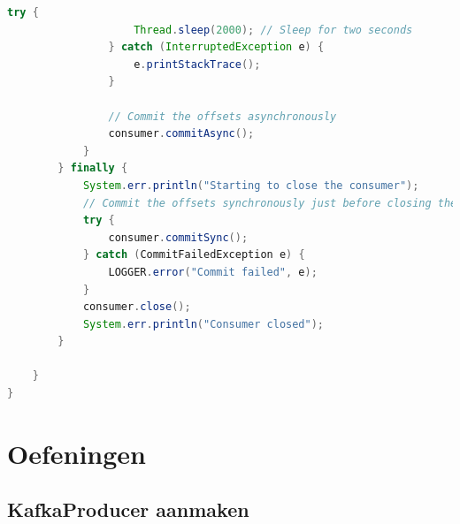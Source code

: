 \documentclass[a4paper,10pt,twoside]{report}
\begin{document}
\begin{lstlisting}[language=Java]
				try {
					Thread.sleep(2000); // Sleep for two seconds 
				} catch (InterruptedException e) {
					e.printStackTrace();
				}
				
				// Commit the offsets asynchronously				
				consumer.commitAsync();				
			}
		} finally {
			System.err.println("Starting to close the consumer");
			// Commit the offsets synchronously just before closing the consumer
			try {
				consumer.commitSync();
			} catch (CommitFailedException e) {
				LOGGER.error("Commit failed", e);	
			}
			consumer.close();
			System.err.println("Consumer closed");
		}
		
	}
}
\end{lstlisting}

\section{Oefeningen}

\subsection{KafkaProducer aanmaken}
\end{document}

